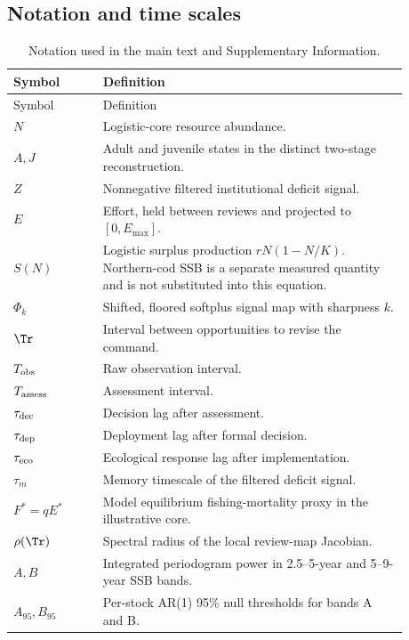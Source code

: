 \subsection{Notation and time scales}
\begin{longtable}{@{}p{0.20\linewidth}p{0.68\linewidth}@{}}
\caption{Notation used in the main text and Supplementary Information.}\label{tab:notation}\\
\toprule Symbol & Definition \\
\midrule\endfirsthead
\toprule Symbol & Definition \\
\midrule\endhead
\bottomrule\endfoot
\(N\) & Logistic-core resource abundance. \\
\(A,J\) & Adult and juvenile states in the distinct two-stage reconstruction. \\
\(Z\) & Nonnegative filtered institutional deficit signal. \\
\(E\) & Effort, held between reviews and projected to \([0,E_{\max}]\). \\
\(S(N)\) & Logistic surplus production \(rN(1-N/K)\). Northern-cod SSB is a separate measured quantity and is not substituted into this equation. \\
\(\Phi_k\) & Shifted, floored softplus signal map with sharpness \(k\). \\
\(\Tr\) & Interval between opportunities to revise the command. \\
\(T_{\rm obs}\) & Raw observation interval. \\
\(T_{\rm assess}\) & Assessment interval. \\
\(\tau_{\rm dec}\) & Decision lag after assessment. \\
\(\tau_{\rm dep}\) & Deployment lag after formal decision. \\
\(\tau_{\rm eco}\) & Ecological response lag after implementation. \\
\(\tau_m\) & Memory timescale of the filtered deficit signal. \\
\(F^*=qE^*\) & Model equilibrium fishing-mortality proxy in the illustrative core. \\
\(\rho(\Tr)\) & Spectral radius of the local review-map Jacobian. \\
\(A,B\) & Integrated periodogram power in 2.5--5-year and 5--9-year SSB bands. \\
\(A_{95},B_{95}\) & Per-stock AR(1) 95\% null thresholds for bands A and B. \\
\end{longtable}

